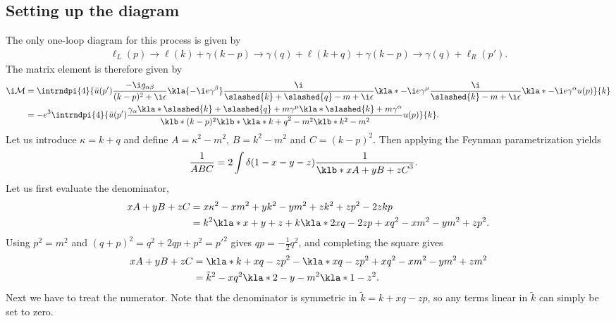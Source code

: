 \documentclass[english, parskip=full]{scrbook}
\begin{document}
\subsection{Setting up the diagram}
The only one-loop diagram for this process is given by
\begin{align}
\ell_L(p) \rightarrow \ell(k) + \gamma(k-p) \rightarrow \gamma(q) + \ell(k+q) + \gamma(k-p) \rightarrow \gamma(q) + \ell_R(p').
\end{align}
The matrix element is therefore given by
\begin{align}
\i\mathcal{M} &= \intrndpi{4}{ \bar{u}(p') \frac{-\i g_{\alpha\beta}}{(k-p)^2+\i\epsilon} \kla{-\i e\gamma^\beta} \frac{\i}{\slashed{k} + \slashed{q} - m + \i\epsilon} \kla*{-\i e\gamma^\mu } \frac{\i}{\slashed{k} - m+\i\epsilon}\kla*{-\i e\gamma^\alpha} u(p) }{k}\\
&= -e^3 \intrndpi{4}{\bar{u}(p') \frac{\gamma_\alpha \kla*{\slashed{k} + \slashed{q} + m} \gamma^\mu \kla*{\slashed{k} + m} \gamma^\alpha}{\klb*{(k-p)^2} \klb*{\kla*{k+q}^2-m^2} \klb*{k^2-m^2}} u(p)}{k}.
\end{align}
Let us introduce $\kappa=k+q$ and define $A=\kappa^2-m^2$, $B=k^2-m^2$ and $C=(k-p)^2$.
Then applying the Feynman parametrization yields
\begin{align}
\frac{1}{ABC} &= 2\int \delta(1-x-y-z) \frac{1}{\klb*{xA+yB+zC}^3}.
\end{align}
Let us first evaluate the denominator,
\begin{align}
xA+yB+zC &= x\kappa^2-xm^2 + yk^2-ym^2 + zk^2+zp^2-2zkp\\
&= k^2 \kla*{x + y + z} + k\kla*{2xq - 2zp} + xq^2 - xm^2-ym^2+zp^2.
\end{align}
Using $p^2=m^2$ and $(q+p)^2=q^2+2qp+p^2=p'^2$ gives $qp=-\frac{1}{2}q^2$, and completing the square gives
\begin{align}
xA+yB+zC &= \kla*{k+xq-zp}^2 - \kla*{xq-zp}^2 + xq^2- xm^2-ym^2+zm^2\\
&= \tilde{k}^2 - xq^2 \kla*{2-y} - m^2\kla*{1-z}^2.
\end{align}
Next we have to treat the numerator.
Note that the denominator is symmetric in $\tilde{k} = k+xq-zp$, so any terms linear in $\tilde{k}$ can simply be set to zero.
\end{document}
